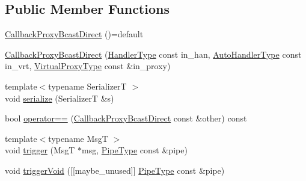 \subsection*{Public Member Functions}
\begin{DoxyCompactItemize}
\item 
\hyperlink{structvt_1_1pipe_1_1callback_1_1_callback_proxy_bcast_direct_a4e1553252066be693d9471399a099d57}{Callback\+Proxy\+Bcast\+Direct} ()=default
\item 
\hyperlink{structvt_1_1pipe_1_1callback_1_1_callback_proxy_bcast_direct_ab3a878cbc7201df43d33dd967d9ca823}{Callback\+Proxy\+Bcast\+Direct} (\hyperlink{namespacevt_af64846b57dfcaf104da3ef6967917573}{Handler\+Type} const in\+\_\+han, \hyperlink{structvt_1_1pipe_1_1callback_1_1_callback_proxy_bcast_direct_a543cd86434430bd048952534f4fbc128}{Auto\+Handler\+Type} const in\+\_\+vrt, \hyperlink{namespacevt_a1b417dd5d684f045bb58a0ede70045ac}{Virtual\+Proxy\+Type} const \&in\+\_\+proxy)
\item 
{\footnotesize template$<$typename SerializerT $>$ }\\void \hyperlink{structvt_1_1pipe_1_1callback_1_1_callback_proxy_bcast_direct_aaa0cd50e42f5585d82425c703e0383b1}{serialize} (SerializerT \&s)
\item 
bool \hyperlink{structvt_1_1pipe_1_1callback_1_1_callback_proxy_bcast_direct_a47efba43a917e20ecdbaa513e502272b}{operator==} (\hyperlink{structvt_1_1pipe_1_1callback_1_1_callback_proxy_bcast_direct}{Callback\+Proxy\+Bcast\+Direct} const \&other) const
\item 
{\footnotesize template$<$typename MsgT $>$ }\\void \hyperlink{structvt_1_1pipe_1_1callback_1_1_callback_proxy_bcast_direct_a8d2fcd9c80915400e96c9094ba26c9d4}{trigger} (MsgT $\ast$msg, \hyperlink{namespacevt_ac9852acda74d1896f48f406cd72c7bd3}{Pipe\+Type} const \&pipe)
\item 
void \hyperlink{structvt_1_1pipe_1_1callback_1_1_callback_proxy_bcast_direct_a34cae4e535a3b920c66acfe1381bbb03}{trigger\+Void} (\mbox{[}\mbox{[}maybe\+\_\+unused\mbox{]}\mbox{]} \hyperlink{namespacevt_ac9852acda74d1896f48f406cd72c7bd3}{Pipe\+Type} const \&pipe)
\end{DoxyCompactItemize}

